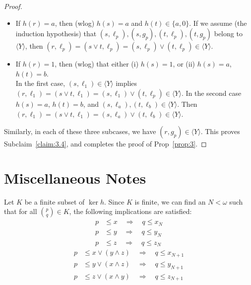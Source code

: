 \begin{proof}
\begin{itemize}
  \item If $h(r) = a$, then (wlog) $h(s) = a$ and $h(t) \in \{a, 0\}$.  If we assume (the induction hypothesis) that $(s, \ell_p), (s, g_p), (t, \ell_p), (t, g_p)$ belong to $\langle Y \rangle$, then $(r, \ell_p) = (s \vee t, \ell_p) =  (s, \ell_p) \vee (t, \ell_p) \in \langle Y \rangle$. 

  \item If $h(r) = 1$, then (wlog) that either (i) $h(s) = 1$, or (ii) $h(s) = a$, $h(t)=b$.\\
  In the first case, $(s, \ell_1) \in \langle Y \rangle$ implies 
  $(r, \ell_1) = (s \vee t, \ell_1) =  (s, \ell_1) \vee (t, \ell_p) \in \langle Y \rangle$.
  In the second case $h(s) = a$, $h(t) = b$, and
  $(s, \ell_a), (t, \ell_b) \in \langle Y \rangle$. Then
  $(r, \ell_1) = (s \vee t, \ell_1) =  (s, \ell_a) \vee (t, \ell_b) \in \langle Y \rangle$.

  \end{itemize}
Similarly, in each of these three subcases, we have $(r, g_p) \in \langle Y \rangle$.
This proves Subclaim~\ref{claim:3.4}, and completes the proof of Prop~\ref{prop:3}.
\end{proof}


\newpage

\section{Miscellaneous Notes}
\noindent Let $K$ be a finite subset of $\ker h$.  Since $K$ is finite, we can find an $N < \omega$ such that for all $\binom{p}{q} \in K$, the following implications are satisfied:
\begin{align}
p &\leqslant x \quad \Longrightarrow \quad q \leqslant x_N\nonumber\\
p &\leqslant y \quad \Longrightarrow \quad q \leqslant y_N\label{eq:imp1}\\
p &\leqslant z \quad \Longrightarrow \quad q \leqslant z_N\nonumber
\end{align}
\begin{align}
p &\leqslant x \vee (y \wedge z) \quad \Longrightarrow \quad q \leqslant x_{N+1}\nonumber\\
p &\leqslant y \vee (x \wedge z) \quad \Longrightarrow \quad q \leqslant y_{N+1}\label{eq:imp2}\\
p &\leqslant z \vee (x \wedge y) \quad \Longrightarrow \quad q \leqslant z_{N+1}\nonumber
\end{align}


